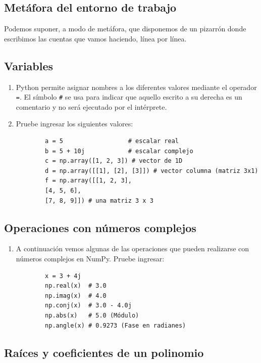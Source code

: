 \documentclass[11pt,a4paper,openany]{book}
\begin{document}
\subsection{Metáfora del entorno de trabajo}

Podemos suponer, a modo de metáfora, que disponemos de un pizarrón donde escribimos las cuentas que vamos haciendo, línea por línea.

\subsection{Variables}

\begin{enumerate}
	
	\item Python permite asignar nombres a los diferentes valores mediante el operador \texttt{=}. El símbolo \texttt{\#} se usa para indicar que aquello escrito a su derecha es un comentario y no será ejecutado por el intérprete.
	
	\item Pruebe ingresar los siguientes valores:
	\begin{verbatim}
		a = 5                  # escalar real
		b = 5 + 10j            # escalar complejo
		c = np.array([1, 2, 3]) # vector de 1D
		d = np.array([[1], [2], [3]]) # vector columna (matriz 3x1)
		f = np.array([[1, 2, 3], 
		[4, 5, 6], 
		[7, 8, 9]]) # una matriz 3 x 3
	\end{verbatim}
\end{enumerate}

\subsection{Operaciones con números complejos}

\begin{enumerate}
	\item A continuación vemos algunas de las operaciones que pueden realizarse con números complejos en NumPy. Pruebe ingresar:
	\begin{verbatim}
		x = 3 + 4j
		np.real(x)  # 3.0
		np.imag(x)  # 4.0
		np.conj(x)  # 3.0 - 4.0j
		np.abs(x)   # 5.0 (Módulo)
		np.angle(x) # 0.9273 (Fase en radianes)
	\end{verbatim}
\end{enumerate}

\subsection{Raíces y coeficientes de un polinomio}
\end{document}
